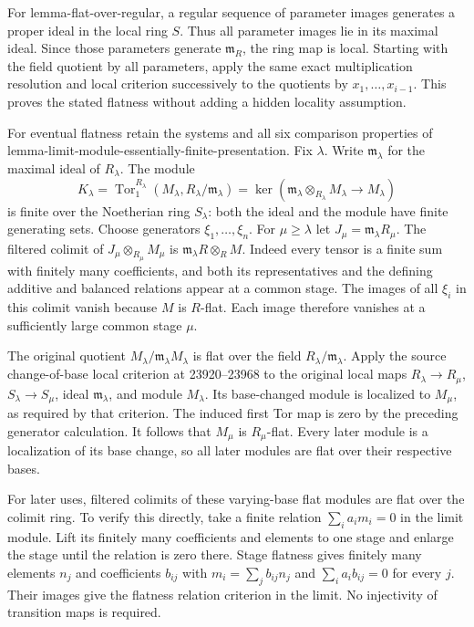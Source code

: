 For lemma-flat-over-regular, a regular sequence of parameter images generates a proper ideal in the local ring \(S\). Thus all parameter images lie in its maximal ideal. Since those parameters generate \(\mathfrak m_R\), the ring map is local. Starting with the field quotient by all parameters, apply the same exact multiplication resolution and local criterion successively to the quotients by \(x_1,\ldots,x_{i-1}\). This proves the stated flatness without adding a hidden locality assumption.

For eventual flatness retain the systems and all six comparison properties of lemma-limit-module-essentially-finite-presentation. Fix \(\lambda\). Write \(\mathfrak m_\lambda\) for the maximal ideal of \(R_\lambda\). The module \[
K_\lambda=\operatorname{Tor}_1^{R_\lambda}
 (M_\lambda,R_\lambda/\mathfrak m_\lambda)
 =\ker(\mathfrak m_\lambda\otimes_{R_\lambda}M_\lambda\longrightarrow M_\lambda)
\] is finite over the Noetherian ring \(S_\lambda\): both the ideal and the module have finite generating sets. Choose generators \(\xi_1,\ldots,\xi_n\). For \(\mu\geq\lambda\) let \(J_\mu=\mathfrak m_\lambda R_\mu\). The filtered colimit of \(J_\mu\otimes_{R_\mu}M_\mu\) is \(\mathfrak m_\lambda R\otimes_R M\). Indeed every tensor is a finite sum with finitely many coefficients, and both its representatives and the defining additive and balanced relations appear at a common stage. The images of all \(\xi_i\) in this colimit vanish because \(M\) is \(R\)-flat. Each image therefore vanishes at a sufficiently large common stage \(\mu\).

The original quotient \(M_\lambda/\mathfrak m_\lambda M_\lambda\) is flat over the field \(R_\lambda/\mathfrak m_\lambda\). Apply the source change-of-base local criterion at 23920--23968 to the original local maps \(R_\lambda\to R_\mu\), \(S_\lambda\to S_\mu\), ideal \(\mathfrak m_\lambda\), and module \(M_\lambda\). Its base-changed module is localized to \(M_\mu\), as required by that criterion. The induced first Tor map is zero by the preceding generator calculation. It follows that \(M_\mu\) is \(R_\mu\)-flat. Every later module is a localization of its base change, so all later modules are flat over their respective bases.

For later uses, filtered colimits of these varying-base flat modules are flat over the colimit ring. To verify this directly, take a finite relation \(\sum_i a_i m_i=0\) in the limit module. Lift its finitely many coefficients and elements to one stage and enlarge the stage until the relation is zero there. Stage flatness gives finitely many elements \(n_j\) and coefficients \(b_{ij}\) with \(m_i=\sum_jb_{ij}n_j\) and \(\sum_i a_i b_{ij}=0\) for every \(j\). Their images give the flatness relation criterion in the limit. No injectivity of transition maps is required.

